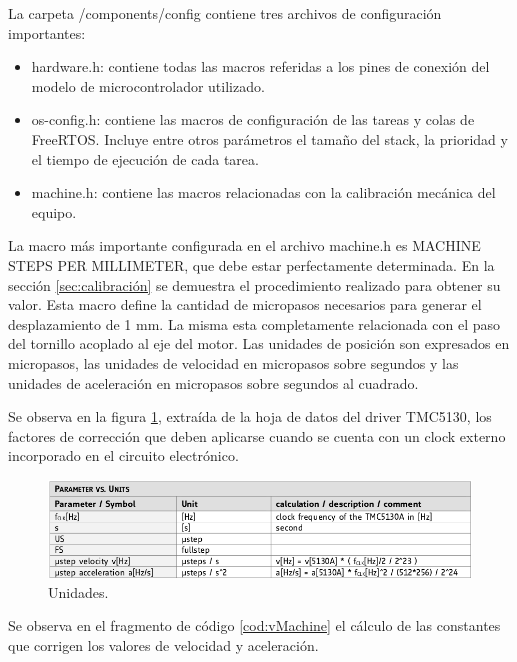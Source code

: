 La carpeta /components/config contiene tres archivos de configuración importantes:
\begin{itemize}
\item hardware.h: contiene todas las macros referidas a los pines de conexión del modelo de microcontrolador utilizado.
\item os-config.h: contiene las macros de configuración de las tareas y colas de FreeRTOS. Incluye entre otros parámetros el tamaño del stack, la prioridad y el tiempo de ejecución de cada tarea.
\item machine.h: contiene las macros relacionadas con la calibración mecánica del equipo.
\end{itemize}


La macro más importante configurada en el archivo machine.h es MACHINE STEPS PER MILLIMETER, que debe estar perfectamente determinada. En la sección \ref{sec:calibración} se demuestra el procedimiento realizado para obtener su valor. Esta macro define la cantidad de micropasos necesarios para generar el desplazamiento de 1 mm. La misma esta completamente relacionada con el paso del tornillo acoplado al eje del motor. Las unidades de posición son expresados en micropasos, las unidades de velocidad en micropasos sobre segundos y las unidades de aceleración en micropasos sobre segundos al cuadrado. 

Se observa en la figura \ref{fig:unidades}, extraída de la hoja de datos del driver TMC5130, los factores de corrección que deben aplicarse cuando se cuenta con un clock externo incorporado en el circuito electrónico. 

\begin{figure}[h!]
	\centering
	\includegraphics[width=1\textwidth]{./Figures/unit.png}
	\caption{Unidades.}
	\label{fig:unidades}
\end{figure}

Se observa en el fragmento de código \ref{cod:vMachine} el cálculo de las constantes que corrigen los valores de velocidad y aceleración.

 
